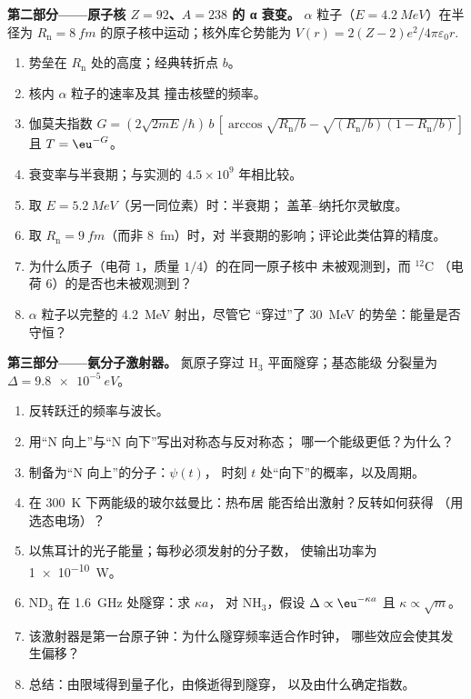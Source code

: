 \begin{problem}
\textbf{第二部分——原子核 $Z = 92$、$A = 238$ 的 α 衰变。}
$\alpha$ 粒子（$E = \qty{4.2}{MeV}$）在半径为
$R_{\text{n}} = \qty{8}{fm}$ 的原子核中运动；核外库仑势能为 $V(r) =
2(Z - 2)e^2/4\pi\varepsilon_0r$.
\begin{enumerate}[resume]
  \item 势垒在 $R_{\text{n}}$ 处的高度；经典转折点
        $b$。
  \item 核内 $\alpha$ 粒子的速率及其
        撞击核壁的频率。
  \item 伽莫夫指数 $G = (2\sqrt{2mE}/\hbar)\,b\,[\arccos\sqrt{R_{\text{n}}/b}
        - \sqrt{(R_{\text{n}}/b)(1 - R_{\text{n}}/b)}]$ 且 $T = \eu^{-G}$。
  \item 衰变率与半衰期；与实测的 $4.5 \times
        10^9$ 年相比较。
  \item 取 $E = \qty{5.2}{MeV}$（另一同位素）时：半衰期；
        盖革–纳托尔灵敏度。
  \item 取 $R_{\text{n}} = \qty{9}{fm}$（而非 \qty{8}{fm}）时，对
        半衰期的影响；评论此类估算的精度。
  \item 为什么质子（电荷 $1$，质量 $1/4$）的在同一原子核中
        未被观测到，而 $^{12}$C
        （电荷 $6$）的是否也未被观测到？
  \item $\alpha$ 粒子以完整的 \qty{4.2}{MeV} 射出，尽管它
        “穿过”了 \qty{30}{MeV} 的势垒：能量是否守恒？
\end{enumerate}

\textbf{第三部分——氨分子激射器。}
氮原子穿过 H$_3$ 平面隧穿；基态能级
分裂量为 $\Delta = \qty{9.8e-5}{eV}$。
\begin{enumerate}[resume]
  \item 反转跃迁的频率与波长。
  \item 用“N 向上”与“N 向下”写出对称态与反对称态；
        哪一个能级更低？为什么？
  \item 制备为“N 向上”的分子：$\psi(t)$，
        时刻 $t$ 处“向下”的概率，以及周期。
  \item 在 \qty{300}{K} 下两能级的玻尔兹曼比：热布居
        能否给出激射？反转如何获得
        （用选态电场）？
  \item 以焦耳计的光子能量；每秒必须发射的分子数，
        使输出功率为 \qty{1e-10}{W}。
  \item ND$_3$ 在 \qty{1.6}{GHz} 处隧穿：求 $\kappa a$，
        对 NH$_3$，假设 $\Delta \propto \eu^{-\kappa a}$ 且 $\kappa \propto \sqrt{m}$。
  \item 该激射器是第一台原子钟：为什么隧穿频率适合作时钟，
        哪些效应会使其发生偏移？
  \item 总结：由限域得到量子化，由倏逝得到隧穿，
        以及由什么确定指数。
\end{enumerate}
\end{problem}

